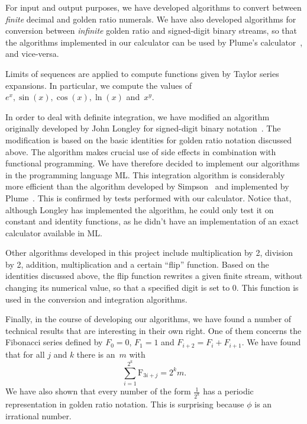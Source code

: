 \documentclass[12pt]{article}
\begin{document}
For input and output purposes, we have developed algorithms to
convert between \emph{finite} decimal and golden ratio numerals. We
have also developed algorithms for conversion between \emph{infinite}
golden ratio and signed-digit binary streams, so that the algorithms
implemented in our calculator can be used by Plume's
calculator~\cite{kn:Plume}, and vice-versa.

Limits of sequences are applied to compute functions given by Taylor
series expansions. In particular, we compute the values of $e^{x},
\sin(x), \cos(x), \ln(x)$ and~$x^{y}$.

In order to deal with definite integration, we have modified an
algorithm originally developed by John Longley for signed-digit binary
notation~\cite{kn:Longley}. The modification is based on the basic
identities for golden ratio notation discussed above.  The algorithm
makes crucial use of side effects in combination with functional
programming. We have therefore decided to implement our algorithms in
the programming language ML. This integration algorithm is
considerably more efficient than the algorithm developed by
Simpson~\cite{kn:Simpson} and implemented by Plume~\cite{kn:Plume}.
This is confirmed by tests performed with our calculator.  Notice
that, although Longley has implemented the algorithm, he could only
test it on constant and identity functions, as he didn't have an
implementation of an exact calculator available in ML.

Other algorithms developed in this project include multiplication by
2, division by 2, addition, multiplication and a certain ``flip''
function. Based on the identities discussed above, the flip function
rewrites a given finite stream, without changing its numerical value,
so that a specified digit is set to $0$. This function is used in the
conversion and integration algorithms.

Finally, in the course of developing our algorithms, we have found a number
of technical results that are interesting in their own right. One of
them concerns the Fibonacci series defined by $F_0=0$, $F_1=1$ and
$F_{i+2}=F_{i}+F_{i+1}$. We have found that for all $j$ and $k$ there
is an~$m$ with
\[ \sum_{i=1}^{2^{k}} \mbox{F}_{3i+j} = 2^{k}m. \]
We have also shown that every number of the form $\frac{1}{2^{k}}$ has
a periodic representation in golden ratio notation. This is surprising because
$\phi$ is an irrational number.
\end{document}
